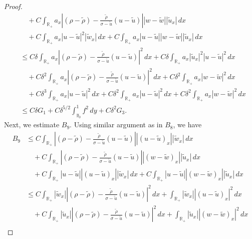 \documentclass[11pt,reqno]{amsart}
\numberwithin{equation}{section} %
\newcommand{\R}{\mathbb{R}}
\begin{document}
\begin{proof}
\begin{align*}
	&\quad + C\int_{\R_+}a_x\left|(\rho-\tilde{\rho})-\frac{\tilde{\rho}}{\sigma-\tilde{u}}(u-\tilde{u})\right||w-\tilde{w}||\tilde{u}_x|\,dx\\
	&\quad + C\int_{\R_+}a_x|u-\tilde{u}|^2|\tilde{w}_x|\,dx +C\int_{\R_+}a_x|u-\tilde{u}||w-\tilde{w}||\tilde{u}_x|\,dx\\
	&\le C\delta\int_{\R_+}a_x\left|(\rho-\tilde{\rho})-\frac{\tilde{\rho}}{\sigma-\tilde{u}}(u-\tilde{u})\right|^2\,dx+C\delta\int_{\R_+}a_x|\tilde{u}_x|^2|u-\tilde{u}|^2\,dx\\
	&\quad + C\delta^2\int_{\R_+}a_x\left|(\rho-\tilde{\rho})-\frac{\tilde{\rho}}{\sigma-\tilde{u}}(u-\tilde{u})\right|^2\,dx+C\delta^2\int_{\R_+}a_x|w-\tilde{w}|^2\,dx\\
	&\quad + C\delta^{3}\int_{\R_+}a_x|u-\tilde{u}|^2\,dx + C\delta^2\int_{\R_+}a_x|u-\tilde{u}|^2\,dx +C\delta^2\int_{\R_+}a_x|w-\tilde{w}|^2\,dx\\
	&\le C\delta G_1 + C\delta^{5/2}\int_{y_0}^1f^2\,dy+C\delta^2G_3.
\end{align*}
Next, we estimate $B_9$. Using similar argument as in $B_8$, we have
\begin{align*}
	B_9%
	&\le C\int_{\R_+}\left|(\rho-\tilde{\rho})-\frac{\tilde{\rho}}{\sigma-\tilde{u}}(u-\tilde{u})\right||(u-\tilde{u})_x||\tilde{w}_x|\,dx\\
	&\quad + C\int_{\R_+}\left|(\rho-\tilde{\rho})-\frac{\tilde{\rho}}{\sigma-\tilde{u}}(u-\tilde{u})\right||(w-\tilde{w})_x||\tilde{u}_x|\,dx\\
	&\quad + C\int_{\R_+}|u-\tilde{u}||(u-\tilde{u})_x||\tilde{w}_x|\,dx +C\int_{\R_+}|u-\tilde{u}||(w-\tilde{w})_x||\tilde{u}_x|\,dx\\
	&\le C\int_{\R_+}|\tilde{w}_x|\left|(\rho-\tilde{\rho})-\frac{\tilde{\rho}}{\sigma-\tilde{u}}(u-\tilde{u})\right|^2\,d x+\int_{\R_+}|\tilde{w}_x||(u-\tilde{u})_x|^2\,d x\\
	&\quad + C\int_{\R_+}|\tilde{u}_x|\left|(\rho-\tilde{\rho})-\frac{\tilde{\rho}}{\sigma-\tilde{u}}(u-\tilde{u})\right|^2\,d x+\int_{\R_+}|\tilde{u}_x||(w-\tilde{w})_x|^2\,d x\\

\end{align*}
\end{proof}
\end{document}
